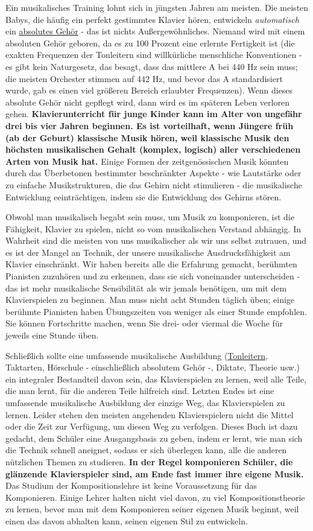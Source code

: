Ein musikalisches Training lohnt sich in jüngsten Jahren am meisten.
Die meisten Babys, die häufig ein perfekt gestimmtes Klavier hören, entwickeln \textit{automatisch} ein \hyperlink{c1iii12}{absolutes Gehör} - das ist nichts Außergewöhnliches.
Niemand wird mit einem absoluten Gehör geboren, da es zu 100 Prozent eine erlernte Fertigkeit ist (die exakten Frequenzen der Tonleitern sind willkürliche menschliche Konventionen - es gibt kein Naturgesetz, das besagt, dass das mittlere A bei 440 Hz sein muss; die meisten Orchester stimmen auf 442 Hz, und bevor das A standardisiert wurde, gab es einen viel größeren Bereich erlaubter Frequenzen).
Wenn dieses absolute Gehör nicht gepflegt wird, dann wird es im späteren Leben verloren gehen.
\textbf{Klavierunterricht für junge Kinder kann im Alter von ungefähr drei bis vier Jahren beginnen.
Es ist vorteilhaft, wenn Jüngere früh (ab der Geburt) klassische Musik hören, weil klassische Musik den höchsten musikalischen Gehalt (komplex, logisch) aller verschiedenen Arten von Musik hat.}
Einige Formen der zeitgenössischen Musik könnten durch das Überbetonen bestimmter beschränkter Aspekte - wie Lautstärke oder zu einfache Musikstrukturen, die das Gehirn nicht stimulieren - die musikalische Entwicklung eeinträchtigen, indem sie die Entwicklung des Gehirns stören.

Obwohl man musikalisch begabt sein muss, um Musik zu komponieren, ist die Fähigkeit, Klavier zu spielen, nicht so vom musikalischen Verstand abhängig.
In Wahrheit sind die meisten von uns musikalischer als wir uns selbst zutrauen, und es ist der Mangel an Technik, der unsere musikalische Ausdrucksfähigkeit am Klavier einschränkt.
Wir haben bereits alle die Erfahrung gemacht, berühmten Pianisten zuzuhören und zu erkennen, dass sie sich voneinander unterscheiden - das ist mehr musikalische Sensibilität als wir jemals benötigen, um mit dem Klavierspielen zu beginnen.
Man muss nicht acht Stunden täglich üben; einige berühmte Pianisten haben Übungszeiten von weniger als einer Stunde empfohlen.
Sie können Fortschritte machen, wenn Sie drei- oder viermal die Woche für jeweils eine Stunde üben.

Schließlich sollte eine umfassende musikalische Ausbildung (\hyperref[c1iii5a]{Tonleitern}, Taktarten, Hörschule - einschließlich absolutem Gehör -, Diktate, Theorie usw.) ein integraler Bestandteil davon sein, das Klavierspielen zu lernen, weil alle Teile, die man lernt, für die anderen Teile hilfreich sind.
Letzten Endes ist eine umfassende musikalische Ausbildung der einzige Weg, das Klavierspielen zu lernen.
Leider stehen den meisten angehenden Klavierspielern nicht die Mittel oder die Zeit zur Verfügung, um diesen Weg zu verfolgen.
Dieses Buch ist dazu gedacht, dem Schüler eine Ausgangsbasis zu geben, indem er lernt, wie man sich die Technik schnell aneignet, sodass er sich überlegen kann, alle die anderen nützlichen Themen zu studieren.
\textbf{In der Regel komponieren Schüler, die glänzende Klavierspieler sind, am Ende fast immer ihre eigene Musik.}
Das Studium der Kompositionslehre ist keine Voraussetzung für das Komponieren.
Einige Lehrer halten nicht viel davon, zu viel Kompositionstheorie zu lernen, bevor man mit dem Komponieren seiner eigenen Musik beginnt, weil einen das davon abhalten kann, seinen eigenen Stil zu entwickeln.

